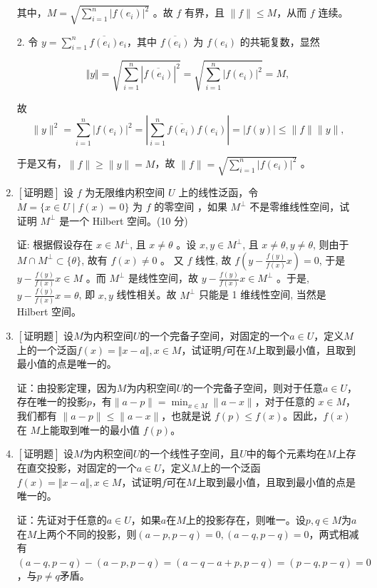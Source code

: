 \documentclass{article}
\begin{document}
\begin{enumerate}
其中，$M=\sqrt{\sum_{i=1}^n\left|f\left(e_i\right)\right|^2}$ 。故 $f$ 有界，且 $\|f\| \leq M$，从而 $f$ 连续。

2. 令 $y=\sum_{i=1}^n \overline{f\left(e_i\right)} e_i$，其中 $\overline{f\left(e_i\right)}$ 为 $f\left(e_i\right)$ 的共轭复数，显然

$$\Vert y \Vert = \sqrt{\sum_{i=1}^{n}{\left|\overline{f\left(e_i\right)}\right|}^2}=\sqrt{\sum_{i=1}^n\left|f\left(e_i\right)\right|^2}=M,$$

故
$$
\|y\|^2=\sum_{i=1}^n\left|f\left(e_i\right)\right|^2=\left|\sum_{i=1}^n \overline{f\left(e_i\right)} f\left(e_i\right)\right|=|f(y)| \leq\|f\|\|y\|,
$$

于是又有，$\|f\| \geq\|y\|=M$，故 $\|f\|=\sqrt{\sum_{i=1}^n\left|f\left(e_i\right)\right|^2}$ 。

    \item $\left[\textbf{证明题}\right]$ 设 $f$ 为无限维内积空间 $U$ 上的线性泛函，令 $M=\{x \in U \mid f(x)=0\}$ 为 $f$ 的零空间
，如果 $M^{\perp}$ 不是零维线性空间，试证明 $M^{\perp}$ 是一个 Hilbert 空间。(10 分)

证: 根据假设存在 $x \in M^{\perp}$, 且 $x \neq \theta$ 。设 $x, y \in M^{\perp}$, 且 $x \neq \theta, y \neq \theta$, 则由于$M \cap M^{\perp} \subset\{\theta\}$, 故有 $f(x) \neq 0$ 。 又 $f$ 线性, 故 $f\left(y-\frac{f(y)}{f(x)} x\right)=0$, 于是 $y-\frac{f(y)}{f(x)} x \in M$ 。而 $M^{\perp}$ 是线性空间，故 $y-\frac{f(y)}{f(x)} x \in M^{\perp}$ 。于是, $y-\frac{f(y)}{f(x)} x=\theta$, 即 $x, y$ 线性相关。故 $M^{\perp}$ 只能是 1 维线性空间, 当然是 Hilbert 空间。

    \item $\left[\textbf{证明题}\right]$ 设$M$为内积空间$U$的一个完备子空间，对固定的一个$a\in U$，定义$M$上的一个泛函$f(x)=\Vert x-a\Vert, x\in M$，试证明$f$可在$M$上取到最小值，且取到最小值的点是唯一的。

    证：由投影定理，因为$M$为内积空间$U$的一个完备子空间，则对于任意$a \in U$，存在唯一的投影$p$，有$\|a-p\|=\min _{x \in M}\|a-x\|$，对于任意的 $x \in M$，我们都有 $\|a-p\| \leq\|a-x\|$，也就是说 $f(p) \leq f(x)$。因此，$f(x)$ 在 $M$上能取到唯一的最小值 $f(p)$。
    
    \item $\left[\textbf{证明题}\right]$ 设$M$为内积空间$U$的一个线性子空间，且$U$中的每个元素均在$M$上存在直交投影，对固定的一个$a\in U$，定义$M$上的一个泛函$f(x)=\Vert x-a\Vert, x\in M$，试证明$f$可在$M$上取到最小值，且取到最小值的点是唯一的。

    证：先证对于任意的$a \in U$，如果$a$在$M$上的投影存在，则唯一。设$p, q \in M$为$a$在$M$上两个不同的投影，则$(a - p, p - q) = 0, (a - q, p - q) = 0$，两式相减有$(a - q, p - q) - (a - p, p - q) = (a-q - a + p, p - q) = (p - q, p - q) = 0$，与$p \neq q$矛盾。


\end{enumerate}
\end{document}
